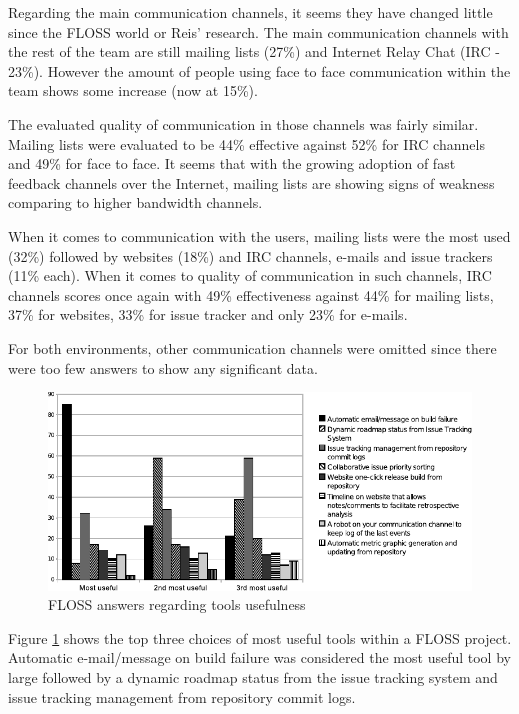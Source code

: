 \documentclass[lnbip]{svmultln}
\begin{document}
Regarding the main communication channels, it seems they have changed
little since the FLOSS world or Reis' research. The main communication
channels with the rest of the team are still mailing lists (27\%) and
Internet Relay Chat (IRC - 23\%). However the amount of people using
face to face communication within the team shows some increase (now at
15\%).

The evaluated quality of communication in those channels was fairly
similar. Mailing lists were evaluated to be 44\% effective against
52\% for IRC channels and 49\% for face to face. It seems that with
the growing adoption of fast feedback channels over the Internet,
mailing lists are showing signs of weakness comparing to higher
bandwidth channels.

When it comes to communication with the users, mailing lists were the
most used (32\%) followed by websites (18\%) and IRC channels, e-mails
and issue trackers (11\% each). When it comes to quality of
communication in such channels, IRC channels scores once again with
49\% effectiveness against 44\% for mailing lists, 37\% for websites,
33\% for issue tracker and only 23\% for e-mails.

For both environments, other communication channels were omitted since
there were too few answers to show any significant data.

\begin{figure}[htb]
  \centering
  \includegraphics[scale=.9]{floss-tools.pdf}
  \caption{FLOSS answers regarding tools usefulness}
  \label{fig:floss-tools}
\end{figure}

Figure \ref{fig:floss-tools} shows the top three choices of most
useful tools within a FLOSS project. Automatic e-mail/message on build
failure was considered the most useful tool by large followed by a
dynamic roadmap status from the issue tracking system and issue
tracking management from repository commit logs.
\end{document}
